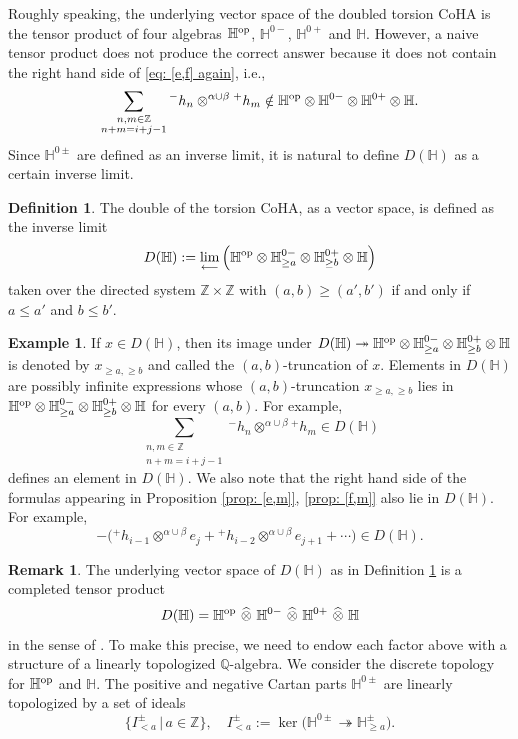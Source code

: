 \documentclass[10pt]{amsart}
\newcommand{\BZ}{\mathbb{Z}}
\newcommand{\BQ}{\mathbb{Q}}
\newcommand{\BH}{\mathbb{H}}
\newcommand{\op}{\textnormal{op}}
\newcommand{\+}{{}^+}
\theoremstyle{definition}
\newtheorem {example}[theorem]{Example}
\theoremstyle {definition}
\newtheorem{remark}[theorem]{Remark}
\theoremstyle {definition}
\newtheorem{definition}[theorem]{Definition}
\begin{document}
Roughly speaking, the underlying vector space of the doubled torsion CoHA is the tensor product of four algebras $\BH^\op$, $\BH^{0-}$, $\BH^{0+}$ and $\BH$. However, a naive tensor product does not produce the correct answer because it does not contain the right hand side of \eqref{eq: [e,f] again}, i.e., 
$$\sum_{\substack{n,m\in \BZ\\ n+m=i+j-1}} {}^{-}h_n\otimes^{\alpha\cup \beta}{}^{+}h_m
\notin \BH^{\op}\otimes \BH^{0-}\otimes \BH^{0+}\otimes\BH. 
$$
Since $\BH^{0\pm}$ are defined as an inverse limit, it is natural to define $D(\BH)$ as a certain inverse limit.  

\begin{definition}\label{def: double}
    The double of the torsion CoHA, as a vector space, is defined as the inverse limit
    $$D(\BH):=\lim_{\longleftarrow} \Big(\BH^{\op}\otimes \BH^{0-}_{\geq a}\otimes \BH^{0+}_{\geq b}\otimes \BH\Big)
    $$
    taken over the directed system $\BZ\times \BZ$ with $(a,b)\geq (a',b')$ if and only if $a\leq a'$ and $b\leq b'$.
\end{definition}

\begin{example}
If $x\in D(\BH)$, then its image under $D(\BH)\twoheadrightarrow \BH^{\op}\otimes \BH^{0-}_{\geq a}\otimes \BH^{0+}_{\geq b}\otimes \BH$ is denoted by $x_{\geq a,\geq b}$ and called the $(a,b)$-truncation of $x$. Elements in $D(\BH)$ are possibly infinite expressions whose $(a,b)$-truncation $x_{\geq a,\geq b}$ lies in $\BH^{\op}\otimes \BH^{0-}_{\geq a}\otimes \BH^{0+}_{\geq b}\otimes \BH$ for every $(a,b)$. For example, 
    $$\sum_{\substack{n,m\in \BZ\\ n+m=i+j-1}} {}^{-}h_n\otimes^{\alpha\cup \beta}{}^{+}h_m\in D(\BH)
$$
defines an element in $D(\BH)$. We also note that the right hand side of the formulas appearing in Proposition \ref{prop: [e,m]}, \ref{prop: [f,m]} also lie in $D(\BH)$. For example, 
$$-\big(\+h_{i-1}\otimes^{\alpha\cup\beta}e_{j}+\+h_{i-2}\otimes^{\alpha\cup\beta}e_{j+1}+\cdots\big)\in D(\BH). 
$$
\end{example}

\begin{remark}
The underlying vector space of $D(\BH)$ as in Definition \ref{def: double} is a completed tensor product 
$$D(\BH)=\BH^{\textnormal{op}}\ \widehat \otimes\ \BH^{0-}\ \widehat \otimes\ \BH^{0+}\ \widehat \otimes\ \BH
$$
in the sense of \cite[Tag 07E7, Tag 0AMQ]{stacks-project}. To make this precise, we need to endow each factor above with a structure of a linearly topologized $\BQ$-algebra. We consider the discrete topology for $\BH^\op$ and $\BH$. The positive and negative Cartan parts $\BH^{0\pm}$ are linearly topologized by a set of ideals 
$$\{I_{<a}^\pm\,|\,a\in \BZ\},\quad I_{<a}^\pm:=\ker\big(\BH^{0\pm}\twoheadrightarrow \BH^{\pm}_{\geq a}\big).
$$
    
\end{remark}
\end{document}
